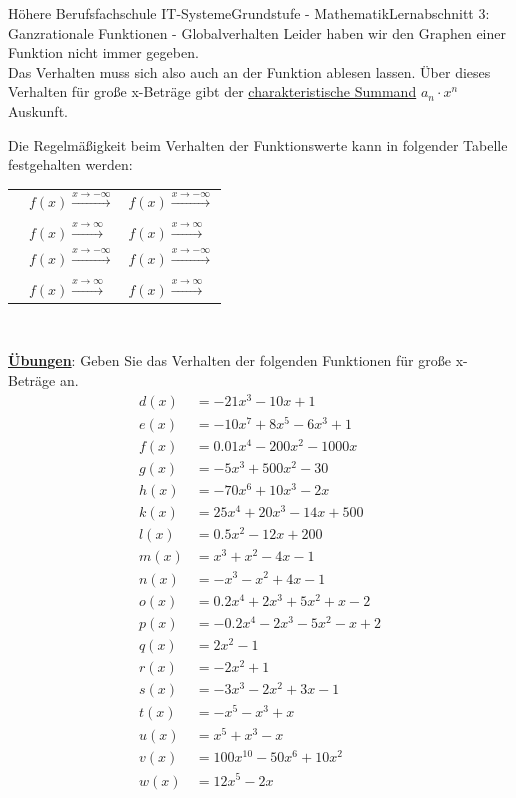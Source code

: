 \documentclass[11pt,twocolumn,oneside,openany,headings=optiontotoc,11pt,numbers=noenddot]{article}
\begin{document}
\begin{worksheet}{Höhere Berufsfachschule IT-Systeme}{Grundstufe - Mathematik}{Lernabschnitt 3: Ganzrationale Funktionen - Globalverhalten}
		Leider haben wir den Graphen einer Funktion nicht immer gegeben.\\
		Das Verhalten muss sich also auch an der Funktion ablesen lassen. Über dieses Verhalten für große x-Beträge gibt der \underline{charakteristische Summand} \(a_n\cdot{}x^n\) Auskunft.\\
		\par\noindent
		Die Regelmäßigkeit beim Verhalten der Funktionswerte kann in folgender Tabelle festgehalten werden:\\
		\begin{tabular}{|l|L{0.2\textwidth}|L{0.15\textwidth}|}
			\hline
			 & & \\
			\hline
			& \(f(x) \xrightarrow{x \rightarrow -\infty}\) & \(f(x) \xrightarrow{x \rightarrow -\infty}\)\\
			& & \\
			& \(f(x) \xrightarrow{x \rightarrow \infty} \) & \(f(x) \xrightarrow{x \rightarrow \infty} \)\\
			\hline
			& \(f(x) \xrightarrow{x \rightarrow -\infty}\) & \(f(x) \xrightarrow{x \rightarrow -\infty}\)\\
			& & \\
			& \(f(x) \xrightarrow{x \rightarrow \infty} \) & \(f(x) \xrightarrow{x \rightarrow \infty} \)\\
			\hline
		\end{tabular}\\
		\par\noindent
		\textbf{\underline{Übungen}}: Geben Sie das Verhalten der folgenden Funktionen für große x-Beträge an.
		\begin{align*}
			d(x) & = -21x^{3} - 10x + 1 \\
			e(x) & = -10x^{7} + 8x^{5} - 6x^{3} + 1\\
			f(x) & = 0.01x^{4} - 200x^{2} - 1000x\\
			g(x) & = -5x^{3} + 500x^{2} - 30\\
			h(x) & = -70x^{6} + 10x^{3} - 2x\\
			k(x) & = 25x^{4} + 20x^{3} - 14x + 500\\
			l(x) & = 0.5x^{2} - 12x + 200\\
			m(x) & = x^{3} + x^{2} - 4x - 1\\
			n(x) & = -x^{3} - x^{2} + 4x - 1\\
			o(x) & = 0.2x^{4} + 2x^{3} + 5x^{2} + x - 2\\
			p(x) & = -0.2x^{4} - 2x^{3} - 5x^{2} - x + 2\\
			q(x) & = 2x^{2} - 1\\
			r(x) & = -2x^{2} + 1\\
			s(x) & = -3x^{3} - 2x^{2} + 3x - 1\\
			t(x) & = -x^{5} - x^{3} + x\\
			u(x) & = x^{5} + x^{3} - x\\
			v(x) & = 100x^{10} - 50x^{6} + 10x^{2}\\
			w(x) & = 12x^{5} - 2x
		\end{align*}
	\end{worksheet}
\end{document}
